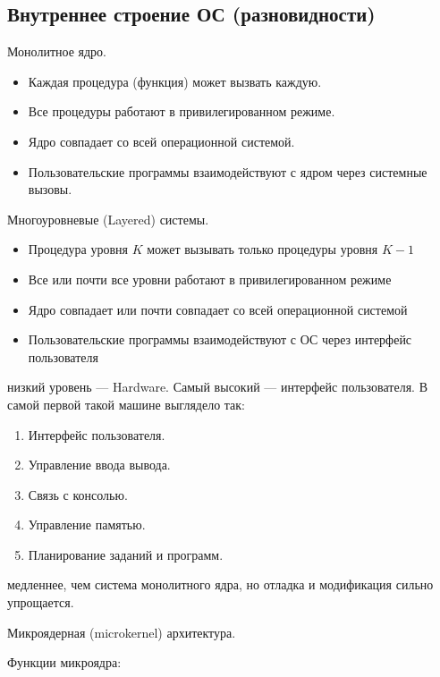 \documentclass[12pt, a4paper]{article}
\newcommand{\mytab}{\hspace{0.5cm}}
\begin{document}
    \subsection*{Внутреннее строение ОС (разновидности)}
    \begin{center}
        Монолитное ядро.
    \end{center}
    \begin{itemize}
        \item Каждая процедура (функция) может вызвать каждую.
        \item Все процедуры работают в привилегированном режиме.
        \item Ядро совпадает со всей операционной системой.
        \item Пользовательские программы взаимодействуют с ядром через системные вызовы.
    \end{itemize}
    \begin{center}
        Многоуровневые (Layered) системы.
    \end{center}
    \begin{itemize}
        \item Процедура уровня $K$ может вызывать только процедуры уровня $K-1$
        \item Все или почти все уровни работают в привилегированном режиме
        \item Ядро совпадает или почти совпадает со всей операционной системой
        \item Пользовательские программы взаимодействуют с ОС через интерфейс пользователя
    \end{itemize}
     низкий уровень --- Hardware. Самый высокий --- интерфейс пользователя.
    В самой первой такой машине выглядело так:
    \begin{enumerate}
        \item Интерфейс пользователя.
        \item Управление ввода вывода.
        \item Связь с консолью.
        \item Управление памятью.
        \item Планирование заданий и программ.
    \end{enumerate}
     медленнее, чем система монолитного ядра, но отладка и модификация сильно упрощается.
    \begin{center}
        Микроядерная (microkernel) архитектура.
    \end{center}
    Функции микроядра:
\end{document}
